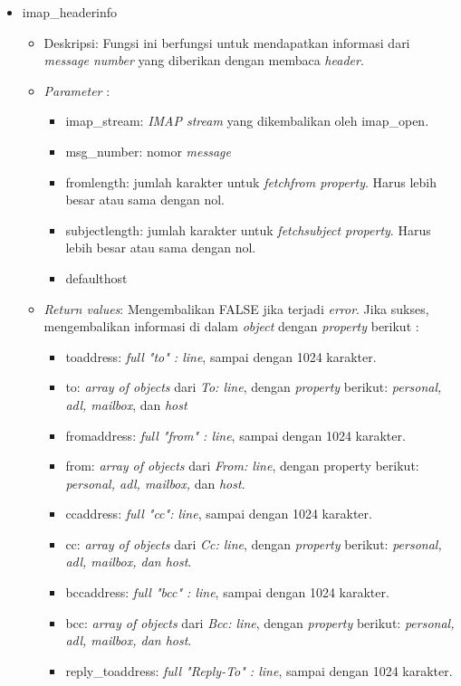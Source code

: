 \begin{itemize}
\item imap\_headerinfo
\begin{itemize}
\item Deskripsi: Fungsi ini berfungsi untuk mendapatkan informasi dari \textit{message number} yang diberikan dengan membaca \textit{header}.
\item \textit{Parameter} :
\begin{itemize}
\item imap\_stream: \textit{IMAP stream} yang dikembalikan oleh imap\_open.
\item msg\_number: nomor \textit{message}
\item fromlength: jumlah karakter untuk \textit{fetchfrom property}. Harus lebih besar atau sama dengan nol.
\item subjectlength: jumlah karakter untuk \textit{fetchsubject property}. Harus lebih besar atau sama dengan nol.
\item defaulthost
\end{itemize}
\item \textit{Return values}: Mengembalikan FALSE jika terjadi \textit{error}. Jika sukses, mengembalikan informasi di dalam \textit{object} dengan \textit{property} berikut :
 \begin{itemize}
 \item toaddress: \textit{full "to" : line}, sampai dengan 1024 karakter.
 \item to: \textit{array of objects} dari \textit{To: line}, dengan \textit{property} berikut: \textit{personal, adl, mailbox}, dan \textit{host}
 \item fromaddress: \textit{full "from" : line}, sampai dengan 1024 karakter.
 \item from: \textit{array of objects} dari \textit{From: line}, dengan property berikut: \textit{personal, adl, mailbox,} dan \textit{host}.
 \item ccaddress: \textit{full "cc": line}, sampai dengan 1024 karakter.
 \item cc: \textit{array of objects} dari \textit{Cc: line}, dengan \textit{property} berikut: \textit{personal, adl, mailbox, dan host}.
 \item bccaddress: \textit{full "bcc" : line}, sampai dengan 1024 karakter.
 \item bcc: \textit{array of objects} dari \textit{Bcc: line}, dengan \textit{property} berikut: \textit{personal, adl, mailbox, dan host}.
 \item reply\_toaddress: \textit{full "Reply-To" : line}, sampai dengan 1024 karakter.

\end{itemize}
\end{itemize}
\end{itemize}
